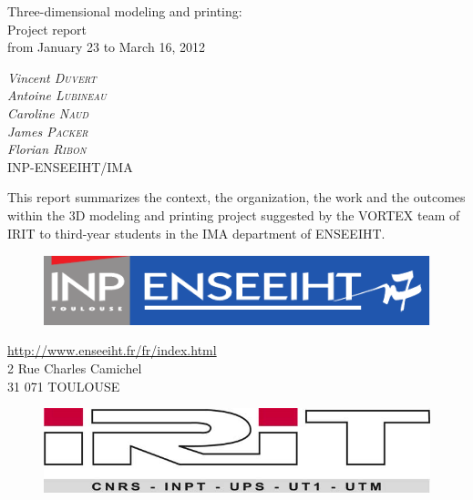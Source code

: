 \documentclass{report}
\begin{document}
\bigskip
\bigskip
\bigskip
\bigskip
\bigskip
\bigskip
\bigskip
\bigskip

\begin{center}
\huge{Three-dimensional modeling and printing:\\ Project report\\}
\bigskip
\bigskip
\Large{from January 23 to March 16, 2012}
\end{center}

\bigskip
\bigskip

\begin{center}
\large{
\textit{Vincent \textsc{Duvert} \\
Antoine \textsc{Lubineau} \\
Caroline \textsc{Naud} \\
James \textsc{Packer} \\
Florian \textsc{Ribon}} \\
\bigskip
INP-ENSEEIHT/IMA 
}
\end{center}

\bigskip
\bigskip

	This report summarizes the context, the organization, the work and the outcomes within the 3D modeling and printing project suggested by the VORTEX team of IRIT to third-year students in the IMA department of ENSEEIHT.

\bigskip
\bigskip

\begin{figure}[!h]
\begin{center}
	\includegraphics[scale=0.4]{inp-enseeiht}
\end{center}
\end{figure}

\bigskip

\begin{center}
\url{http://www.enseeiht.fr/fr/index.html} \\
2 Rue Charles Camichel \\
31 071 TOULOUSE
\end{center}

\vfill

\begin{figure}[!h]
\begin{center}
	\includegraphics[scale=0.4]{irit}
\end{center}
\end{figure}
\end{document}
